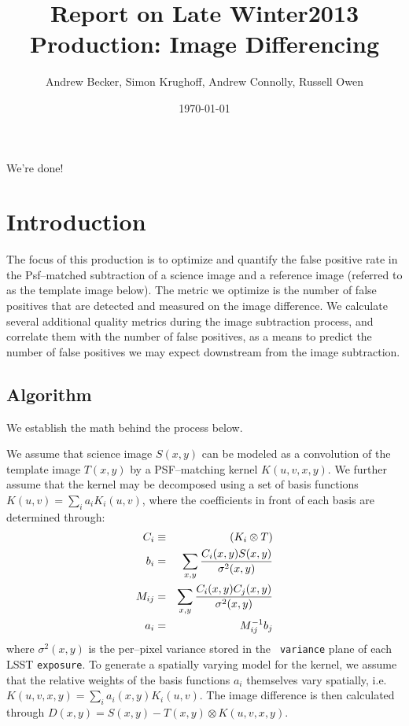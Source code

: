 \documentclass[prd, nofootinbib, floatfix, 11pt,tightenlines,times]{article}
\author{Andrew Becker, Simon Krughoff, Andrew Connolly, Russell Owen}
\title{Report on Late Winter2013 Production: Image Differencing}
\date{\today}
\begin{document}
\maketitle

We're done!

\clearpage
\tableofcontents
\clearpage

\section{Introduction}

The focus of this production is to optimize and quantify the false
positive rate in the Psf--matched subtraction of a science image and a
reference image (referred to as the template image below).  The metric
we optimize is the number of false positives that are detected and
measured on the image difference.  We calculate several additional
quality metrics during the image subtraction process, and correlate
them with the number of false positives, as a means to predict the
number of false positives we may expect downstream from the image
subtraction.

\subsection{Algorithm}

We establish the math behind the process below.  

We assume that science image $S(x,y)$ can be modeled as a convolution
of the template image $T(x,y)$ by a PSF--matching kernel $K(u,v,x,y)$.
We further assume that the kernel may be decomposed using a set of
basis functions $K(u,v) = \sum_i a_i K_i(u,v)$, where the coefficients
in front of each basis are determined through:
%
\begin{eqnarray}
C_i & \equiv & (K_i \otimes T) \\ \nonumber
b_{i}  & = & \sum_{x,y} {{C_i(x,y) S(x,y)}\over{\sigma^2(x,y)}}   \nonumber \\ 
M_{ij} & = & \sum_{x,y} {{C_i(x,y) C_j(x,y)}\over{\sigma^2(x,y)}}  \nonumber \\ 
a_{i}  & = & M^{-1}_{ij} b_{j} \nonumber 
\label{eq-soln}
\end{eqnarray}
where $\sigma^2(x,y)$ is the per--pixel variance stored in the {\tt
  variance} plane of each LSST {\tt exposure}.  To generate a
spatially varying model for the kernel, we assume that the relative
weights of the basis functions $a_i$ themselves vary spatially,
i.e. $K(u,v,x,y) = \sum_i a_i(x,y) K_i(u,v)$.  The image difference is
then calculated through $D(x,y) = S(x,y) - T(x,y) \otimes K(u,v,x,y)$.
\end{document}
